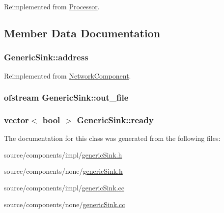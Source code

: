 Reimplemented from \hyperlink{classProcessor_d3bdbedfbb00b05f61504e411a418106}{Processor}.

\subsection{Member Data Documentation}
\hypertarget{classGenericSink_ccb1d47a4bec1322b3e8c996933e4aaf}{
\subsubsection[{address}]{ {\bf GenericSink::address}}}
\label{classGenericSink_ccb1d47a4bec1322b3e8c996933e4aaf}




Reimplemented from \hyperlink{classNetworkComponent_0428749bde908497630b506071d52191}{NetworkComponent}.\hypertarget{classGenericSink_6f54713b76e768ddf16799d4921b497f}{
\subsubsection[{out\_\-file}]{\setlength{\rightskip}{0pt plus 5cm}ofstream {\bf GenericSink::out\_\-file}}}
\label{classGenericSink_6f54713b76e768ddf16799d4921b497f}


\hypertarget{classGenericSink_ad331b8bfcbeb647f237e5b489868a94}{
\subsubsection[{ready}]{\setlength{\rightskip}{0pt plus 5cm}vector$<$ bool $>$ {\bf GenericSink::ready}}}
\label{classGenericSink_ad331b8bfcbeb647f237e5b489868a94}




The documentation for this class was generated from the following files:\begin{CompactItemize}
\item 
source/components/impl/\hyperlink{impl_2genericSink_8h}{genericSink.h}\item 
source/components/none/\hyperlink{none_2genericSink_8h}{genericSink.h}\item 
source/components/impl/\hyperlink{impl_2genericSink_8cc}{genericSink.cc}\item 
source/components/none/\hyperlink{none_2genericSink_8cc}{genericSink.cc}\end{CompactItemize}
